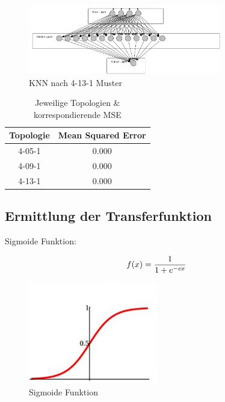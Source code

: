 \begin{figure}[htbp]
\centering
		\includegraphics[width=0.75\textwidth]{4-13-1.PNG}
	\caption{KNN nach 4-13-1 Muster}
	\label{fig:KNN nach 4-13-1 Muster}
\end{figure}


\begin{table}
  \centering
  \begin{tabular}{|c|c|}
  \hline 
  \rule[0ex]{0pt}{2.5ex} Topologie & Mean Squared Error \\ 
  \hline 
  \rule[0ex]{0pt}{2.5ex} 4-05-1 & 0.000 \\ 
  \hline 
  \rule[0ex]{0pt}{2.5ex} 4-09-1 & 0.000 \\ 
  \hline 
  \rule[0ex]{0pt}{2.5ex} 4-13-1 & 0.000 \\ 
  \hline 
  \end{tabular} 
  \caption{Jeweilige Topologien \& korrespondierende MSE}
  \label{tab:myfirsttable}
\end{table}


\subsection{Ermittlung der Transferfunktion} %

Sigmoide Funktion:

\begin{equation}\formelentry{Sigmoide Funktion}
f(x)= \frac{1}{1+e^{-cx}}
\end{equation}

\begin{figure}[htbp]
\centering
		\includegraphics[width=0.5\textwidth]{Sigmoid.PNG}
	\caption{Sigmoide Funktion}
	\label{fig:Sigmoide Funktion}
\end{figure}

